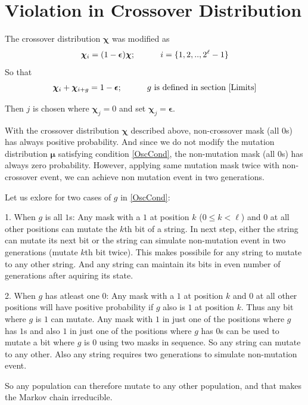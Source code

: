 \section{Violation in Crossover Distribution}
The crossover distribution $\bm{\chi}$ was modified as
\[
\bm{\chi}_i = (1-\bm{\epsilon}) \bm{\chi} ; \hspace{30pt} i = \{1, 2,.., 2^{\ell}-1\} 
\]
So that 
\[
\bm{\chi}_i + \bm{\chi}_{i+g} = 1-\bm{\epsilon} ; \hspace{30pt} g \text{ is defined in  section } \ref{Limits}
\]

Then $j$ is chosen where $\bm{\chi}_j = 0$ and set $\bm{\chi}_j = \bm{\epsilon}$. 

With the crossover distribution $\bm{\chi}$ described above, non-crossover mask (all 0s) has always positive probability. 
And since we do not modify the mutation distribution $\bm{\mu}$ satisfying condition \ref{OscCond}, 
the non-mutation mask (all 0s) has always zero probability. 
However, applying same mutation mask twice with non-crossover event, 
we can achieve non mutation event in two generations. 

Let us exlore for two cases of $g$ in \ref{OscCond}:

1. When $g$ is all $1$s:\newline
Any mask with a $1$ at position $k$ ($0 \leq k < \ell$) and $0$ at all other positions can mutate the $k$th bit of a string.  In next step, 
either the string can mutate its next bit or the string can simulate non-mutation event in two generations (mutate $k$th bit twice). 
This makes possibile for any string to mutate to 
any other string. And any string can maintain its bits in even number of generations after aquiring its state. 

2. When $g$ has atleast one $0$:\newline
Any mask with a $1$ at position $k$ and $0$ at all other positions  
will have positive probability if $g$ also is $1$ at position $k$. 
Thus any bit where $g$ is $1$ can mutate.  
Any mask with $1$ in just one of the positions where $g$ has $1$s and 
also $1$ in just one of the positions where $g$ has $0$s can be used to 
mutate a bit where $g$ is $0$ using two masks in sequence. 
So any string can mutate to any other. 
Also any string requires two generations to simulate non-mutation event. 

So any population can therefore mutate to any other population, 
and that makes the Markov chain irreducible.

